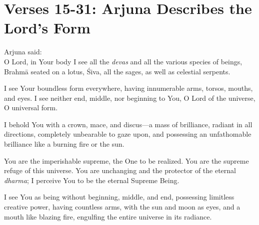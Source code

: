 \section{Verses 15-31: Arjuna Describes the Lord's Form}\label{sec-verses-15-31-arjuna-describes-the-lord-s-form}


{\hspace*{1em}Arjuna said: \\
O Lord, in Your body I see all the \textit{devas} and all the various species of beings, Brahmā seated on a lotus, Śiva, all the sages, as well as celestial serpents.}

{I see Your boundless form everywhere, having innumerable arms, torsos, mouths, and eyes. I see neither end, middle, nor beginning to You, O Lord of the universe, O universal form.}

{I behold You with a crown, mace, and discus---a mass of brilliance, radiant in all directions, completely unbearable to gaze upon, and possessing an unfathomable brilliance like a burning fire or the sun.}

{You are the imperishable supreme, the One to be realized. You are the supreme refuge of this universe. You are unchanging and the protector of the eternal \textit{dharma}; I perceive You to be the eternal Supreme Being.}

{I see You as being without beginning, middle, and end, possessing limitless creative power, having countless arms, with the sun and moon as eyes, and a mouth like blazing fire, engulfing the entire universe in its radiance.}

